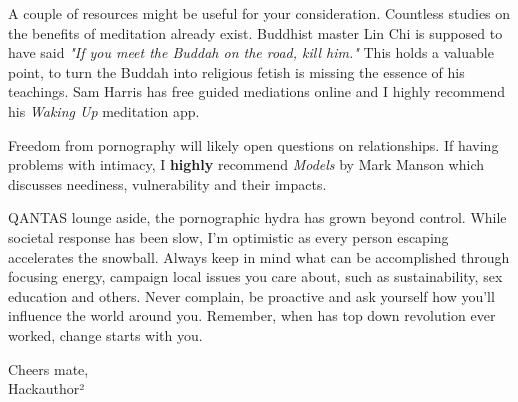 \documentclass[easypeasy.tex]{subfiles}
\begin{document}
A couple of resources might be useful for your consideration. Countless studies on the benefits of meditation already exist. Buddhist master Lin Chi is supposed to have said \textit{"If you meet the Buddah on the road, kill him."} This holds a valuable point, to turn the Buddah into religious fetish is missing the essence of his teachings. Sam Harris has free guided mediations online and I highly recommend his \textit{Waking Up} meditation app.

Freedom from pornography will likely open questions on relationships. If having problems with intimacy, I \textbf{highly} recommend \textit{Models} by Mark Manson which discusses neediness, vulnerability and their impacts.

QANTAS lounge aside, the pornographic hydra has grown beyond control. While societal response has been slow, I'm optimistic as every person escaping accelerates the snowball. Always keep in mind what can be accomplished through focusing energy, campaign local issues you care about, such as sustainability, sex education and others. Never complain, be proactive and ask yourself how you'll influence the world around you. Remember, when has top down revolution ever worked, change starts with you.

Cheers mate, \\
Hackauthor²
\end{document}
